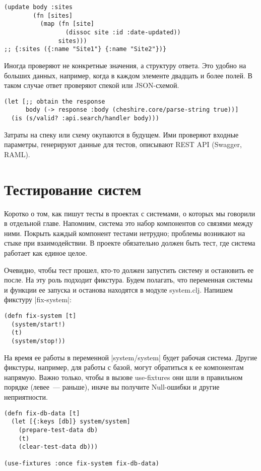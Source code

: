 \begin{verbatim}
(update body :sites
        (fn [sites]
          (map (fn [site]
                 (dissoc site :id :date-updated))
               sites)))
;; {:sites ({:name "Site1"} {:name "Site2"})}
\end{verbatim}

Иногда проверяют не конкретные значения, а структуру ответа. Это удобно на
больших данных, например, когда в каждом элементе двадцать и более полей. В
таком случае ответ проверяют спекой или JSON-схемой.

\begin{verbatim}
(let [;; obtain the response
      body (-> response :body (cheshire.core/parse-string true))]
  (is (s/valid? :api.search/handler body)))
\end{verbatim}

Затраты на спеку или схему окупаются в будущем. Ими проверяют входные параметры,
генерируют данные для тестов, описывают REST API (Swagger, RAML).

\section{Тестирование систем}

Коротко о том, как пишут тесты в проектах с системами, о которых мы говорили в
отдельной главе. Напомним, система это набор компонентов со связями между
ними. Покрыть каждый компонент тестами нетрудно; проблемы возникают на стыке при
взаимодействии. В проекте обязательно должен быть тест, где система работает как
единое целое.

Очевидно, чтобы тест прошел, кто-то должен запустить систему и остановить ее
после. На эту роль подходит фикстура. Будем полагать, что переменная системы и
функции ее запуска и останова находятся в модуле system.clj. Напишем фикстуру
\spverb|fix-system|:

\begin{verbatim}
(defn fix-system [t]
  (system/start!)
  (t)
  (system/stop!))
\end{verbatim}

На время ее работы в переменной \spverb|system/system| будет рабочая система. Другие
фикстуры, например, для работы с базой, могут обратиться к ее компонентам
напрямую. Важно только, чтобы в вызове use-fixtures они шли в правильном порядке
(левее~--- раньше), иначе вы получите Null-ошибки и другие неприятности.

\begin{verbatim}
(defn fix-db-data [t]
  (let [{:keys [db]} system/system]
    (prepare-test-data db)
    (t)
    (clear-test-data db)))

(use-fixtures :once fix-system fix-db-data)
\end{verbatim}

